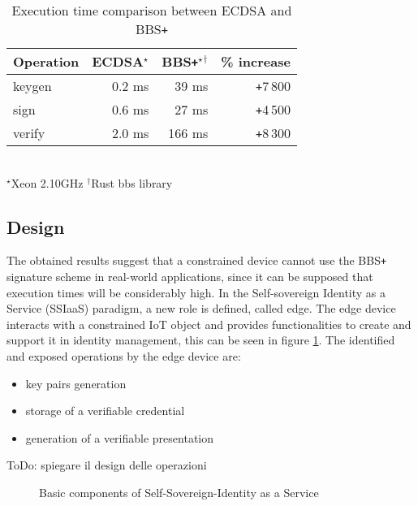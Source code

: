 \begin{table}[!h]
    \centering
    \begin{tabular}{| l || r | r | r|}
        \hline 
        \textbf{Operation} & \textbf{ECDSA}$^\star$ & \textbf{BBS\texttt{+}}$^\star$$^\dagger$ & \textbf{\% increase} \\ [0.5ex] 
        \hline  \hline 
        keygen   & 0.2   ms      & 39 ms   &\texttt{+}7\,800\\
        \hline
        sign     & 0.6   ms      & 27  ms   &\texttt{+}4\,500\\
        \hline
        verify   & 2.0  ms         & 166 ms   &\texttt{+}8\,300\\
        \hline
    \end{tabular}
    \\
    \footnotesize $^\star$Xeon 2.10GHz \enspace\enspace $^\dagger$Rust bbs library
    \caption{Execution time comparison between ECDSA and BBS\texttt{+}}
    \label{time-table2}
\end{table}

\subsection{Design}
The obtained results suggest that a constrained device cannot use the BBS\texttt{+} signature scheme in real-world applications, since it can be supposed that execution times will be considerably high. In the Self-sovereign Identity as a Service (SSIaaS) paradigm, a new role is defined, called edge. The edge device interacts with a constrained IoT object and provides functionalities to create and support it in identity management, this can be seen in figure \ref{poc-design}. The identified and exposed operations by the edge device are:
\begin{itemize}
    \item key pairs generation
    \item storage of a verifiable credential
    \item generation of a verifiable presentation
\end{itemize}

{\color{red} ToDo: spiegare il design delle operazioni}
\begin{figure}[!h]
    \centering
    
    \caption{Basic components of Self-Sovereign-Identity as a Service}
    \label{poc-design}
\end{figure}

